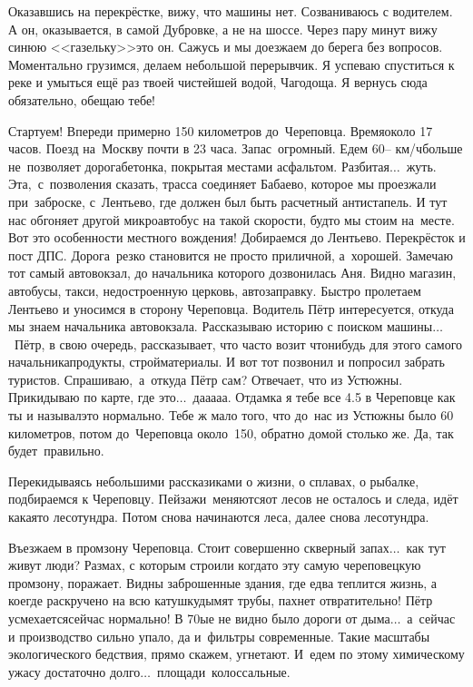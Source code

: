 Оказавшись на перекрёстке, вижу, что машины нет. Созваниваюсь с водителем. А он, оказывается, в самой Дубровке, а не на шоссе. Через пару минут вижу синюю <<газельку>>\mdash это он. Сажусь и мы доезжаем до берега без вопросов. Моментально грузимся, делаем небольшой перерывчик. Я успеваю спуститься к реке и умыться ещё раз твоей чистейшей водой, Чагодоща. Я вернусь сюда обязательно, обещаю тебе!

Стартуем! Впереди примерно 150 километров до~Череповца. Время\mdash около 17 часов. Поезд на~Москву почти в 23 часа. Запас~огромный. Едем 60\thinspace\nobreakdash-- км/ч\mdash больше не~позволяет дорога\mdash бетонка, покрытая местами асфальтом. Разбитая$\ldots$~жуть. Эта,~с~позволения сказать, трасса соединяет Бабаево, которое мы проезжали при~заброске, с~Лентьево, где должен был быть расчетный антистапель. И тут нас обгоняет другой микроавтобус на такой скорости, будто мы стоим на~месте. Вот это особенности местного вождения! 
\newpage
Добираемся до Лентьево. Перекрёсток и пост ДПС. Дорога~резко становится не просто приличной, а~хорошей. Замечаю тот самый автовокзал, до начальника которого дозвонилась Аня. Видно магазин, автобусы, такси, недостроенную церковь, автозаправку. Быстро пролетаем Лентьево и уносимся в сторону Череповца. Водитель Пётр интересуется, откуда мы знаем начальника автовокзала. Рассказываю историю с поиском машины$\ldots$~Пётр, в свою очередь, рассказывает, что часто возит что\sdash нибудь для этого самого начальника\mdash продукты, стройматериалы. И вот тот позвонил и попросил забрать туристов. Спрашиваю,~а~откуда Пётр сам? Отвечает, что из Устюжны. Прикидываю по карте, где это$\ldots$~да\sdash а\sdash а\sdash а\sdash а. Отдам\sdash ка я тебе все 4.5 в Череповце как ты и называл\mdash это нормально. Тебе ж мало того, что до~нас из Устюжны было 60 километров, потом до~Череповца около~150, обратно домой столько же. Да, так будет~правильно. 

Перекидываясь небольшими рассказиками о жизни, о сплавах, о рыбалке, подбираемся к Череповцу. Пейзажи~меняются\mdash от лесов не осталось и следа, идёт какая\sdash то лесотундра. Потом снова начинаются леса, далее снова лесотундра. 

Въезжаем в промзону Череповца. Стоит совершенно скверный запах$\ldots$~как тут живут люди? Размах, с которым строили когда\sdash то эту самую череповецкую промзону, поражает. Видны заброшенные здания, где едва теплится жизнь, а кое\sdash где раскручено на всю катушку\mdash дымят трубы, пахнет отвратительно! Пётр усмехается\mdash сейчас нормально! В 70\sdash ые не видно было дороги от дыма$\ldots$~а~сейчас и производство сильно упало, да и~фильтры современные. Такие масштабы экологического бедствия, прямо скажем, угнетают. И~едем по этому химическому ужасу достаточно долго$\ldots$~площади~колоссальные.

